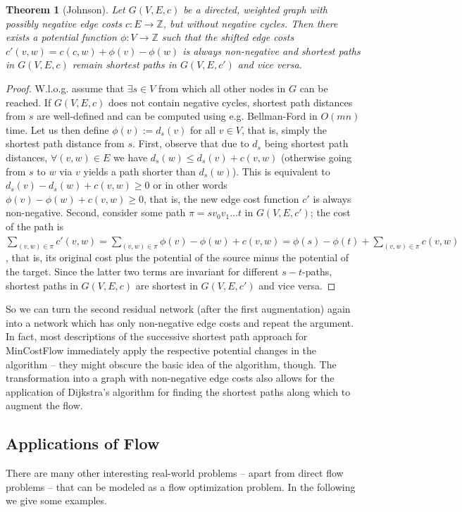 \documentclass{article}
\newtheorem{theorem}{Theorem}
\begin{document}
\begin{theorem}[Johnson]
Let $G(V,E,c)$ be a directed, weighted graph with possibly negative edge costs $c:E\rightarrow \mathbb{Z}$, but without negative cycles. Then there exists a potential function $\phi:V\rightarrow \mathbb{Z}$ such that the shifted edge costs $c'(v,w)=c(c,w)+\phi(v)-\phi(w)$ is always non-negative and shortest paths in $G(V,E,c)$ remain shortest paths in $G(V,E,c')$ and vice versa.
\end{theorem}
\begin{proof}
W.l.o.g. assume that $\exists s\in V$ from which all other nodes in $G$ can be reached. If $G(V,E,c)$ does not contain negative cycles, shortest path distances from $s$ are well-defined and can be computed using e.g. Bellman-Ford in $O(mn)$ time. Let us then define $\phi(v):=d_s(v)$ for all $v\in V$, that is, simply the shortest path distance from $s$. First, observe that due to $d_s$ being shortest path distances, $\forall (v,w)\in E$ we have $d_s(w)\leq d_s(v)+c(v,w)$ (otherwise going from $s$ to $w$ via $v$ yields a path shorter than $d_s(w)$). This is equivalent to $d_s(v)-d_s(w)+c(v,w)\geq 0$ or in other words $\phi(v)-\phi(w)+c(v,w)\geq 0$, that is, the new edge cost function $c'$ is always non-negative. Second, consider some path $\pi=sv_0v_1\dots t$ in $G(V,E,c')$; the cost of the path is $\sum_{(v,w)\in \pi} c'(v,w)=\sum_{(v,w)\in \pi} \phi(v)-\phi(w)+c(v,w)=\phi(s)-\phi(t)+\sum_{(v,w)\in\pi}c(v,w)$, that is, its original cost plus the potential of the source minus the potential of the target. Since the latter two terms are invariant for different $s-t$-paths, shortest paths in $G(V,E,c)$ are shortest in $G(V,E,c')$ and vice versa.
\end{proof}


So we can turn the second residual network (after the first augmentation) again into a network which has only non-negative edge costs and repeat the argument. In fact, most descriptions of the successive shortest path approach for MinCostFlow immediately apply the respective potential changes in the algorithm -- they might obscure the basic idea of the algorithm, though. The transformation into a graph with non-negative edge costs also allows for the application of Dijkstra's algorithm for finding the shortest paths along which to augment the flow.

\subsection{Applications of Flow}
There are many other interesting real-world problems -- apart from direct flow problems -- that can be modeled as a flow optimization problem. In the following we give some examples. 
\end{document}

